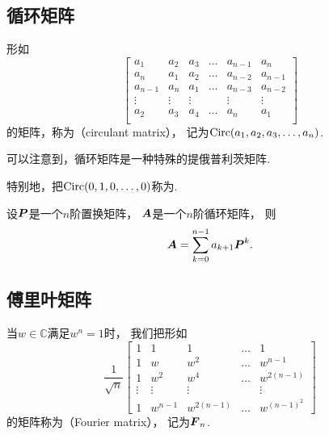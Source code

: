 \subsection{循环矩阵}
形如\begin{equation*}
	\begin{bmatrix}
		a_1 & a_2 & a_3 & \dots & a_{n-1} & a_n \\
		a_n & a_1 & a_2 & \dots & a_{n-2} & a_{n-1} \\
		a_{n-1} & a_n & a_1 & \dots & a_{n-3} & a_{n-2} \\
		\vdots & \vdots & \vdots & & \vdots & \vdots \\
		a_2 & a_3 & a_4 & \dots & a_n & a_1 \\
	\end{bmatrix}
\end{equation*}
的矩阵，称为（circulant matrix），
记为\(\operatorname{Circ}(a_1,a_2,a_3,\dotsc,a_n)\).


可以注意到，循环矩阵是一种特殊的提俄普利茨矩阵.

特别地，把\(\operatorname{Circ}(0,1,0,\dotsc,0)\)称为.

\begin{proposition}
设\(\boldsymbol{P}\)是一个\(n\)阶置换矩阵，
\(\boldsymbol{A}\)是一个\(n\)阶循环矩阵，
则\begin{equation*}
	\boldsymbol{A} = \sum_{k=0}^{n-1} a_{k+1} \boldsymbol{P}^k.
\end{equation*}
\end{proposition}

\subsection{傅里叶矩阵}
当\(w \in \mathbb{C}\)满足\(w^n = 1\)时，
我们把形如\begin{equation*}
	\frac1{\sqrt{n}}
	\begin{bmatrix}
		1 & 1 & 1 & \dots & 1 \\
		1 & w & w^2 & \dots & w^{n-1} \\
		1 & w^2 & w^4 & \dots & w^{2(n-1)} \\
		\vdots & \vdots & \vdots & & \vdots \\
		1 & w^{n-1} & w^{2(n-1)} & \dots & w^{(n-1)^2}
	\end{bmatrix}
\end{equation*}
的矩阵称为（Fourier matrix），
记为\(\boldsymbol{F}_n\).


